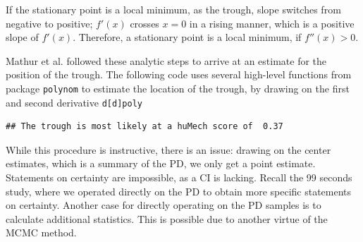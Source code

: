 \documentclass[]{svmono}
\newenvironment{Shaded}{\begin{snugshade}}{\end{snugshade}}
\newcommand{\KeywordTok}[1]{\textcolor[rgb]{0.13,0.29,0.53}{\textbf{#1}}}
\newcommand{\DecValTok}[1]{\textcolor[rgb]{0.00,0.00,0.81}{#1}}
\newcommand{\StringTok}[1]{\textcolor[rgb]{0.31,0.60,0.02}{#1}}
\newcommand{\CommentTok}[1]{\textcolor[rgb]{0.56,0.35,0.01}{\textit{#1}}}
\newcommand{\OperatorTok}[1]{\textcolor[rgb]{0.81,0.36,0.00}{\textbf{#1}}}
\newcommand{\NormalTok}[1]{#1}
\begin{document}
If the stationary point is a local minimum, as the trough, slope
switches from negative to positive; \(f'(x)\) crosses \(x = 0\) in a
rising manner, which is a positive slope of \(f'(x)\). Therefore, a
stationary point is a local minimum, if \(f''(x) > 0\).

Mathur et al. followed these analytic steps to arrive at an estimate for
the position of the trough. The following code uses several high-level
functions from package \texttt{polynom} to estimate the location of the
trough, by drawing on the first and second derivative
\texttt{d{[}d{]}poly}

\begin{Shaded}
\end{Shaded}

\begin{verbatim}
## The trough is most likely at a huMech score of  0.37
\end{verbatim}

While this procedure is instructive, there is an issue: drawing on the
center estimates, which is a summary of the PD, we only get a point
estimate. Statements on certainty are impossible, as a CI is lacking.
Recall the 99 seconds study, where we operated directly on the PD to
obtain more specific statements on certainty. Another case for directly
operating on the PD samples is to calculate additional statistics. This
is possible due to another virtue of the MCMC method.
\end{document}
